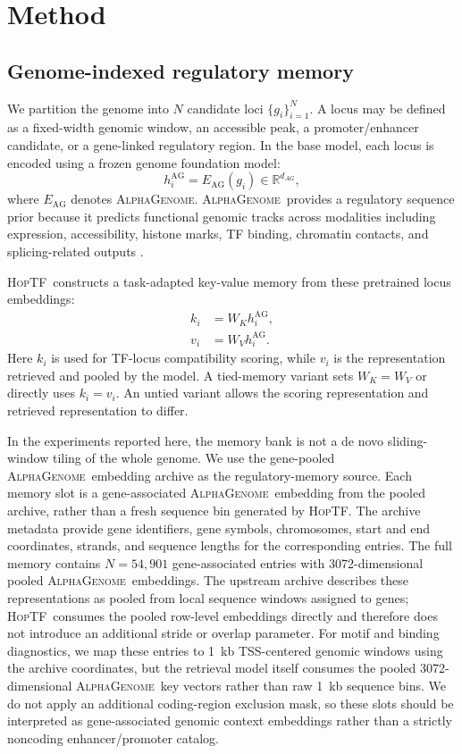 \documentclass[11pt]{article}
\newcommand{\hoptf}{\textsc{HopTF}}
\newcommand{\ag}{\textsc{AlphaGenome}}
\begin{document}
\section{Method}

\subsection{Genome-indexed regulatory memory}

We partition the genome into \(N\) candidate loci \(\{g_i\}_{i=1}^N\). A locus may be defined as a fixed-width genomic window, an accessible peak, a promoter/enhancer candidate, or a gene-linked regulatory region. In the base model, each locus is encoded using a frozen genome foundation model:
\begin{equation}
    h_i^{\mathrm{AG}} = E_{\mathrm{AG}}(g_i) \in \mathbb{R}^{d_{AG}},
\end{equation}
where \(E_{\mathrm{AG}}\) denotes \ag. \ag\ provides a regulatory sequence prior because it predicts functional genomic tracks across modalities including expression, accessibility, histone marks, TF binding, chromatin contacts, and splicing-related outputs \citep{avsec2026}.

\hoptf\ constructs a task-adapted key-value memory from these pretrained locus embeddings:
\begin{align}
    k_i &= W_K h_i^{\mathrm{AG}}, \\
    v_i &= W_V h_i^{\mathrm{AG}}.
\end{align}
Here \(k_i\) is used for TF-locus compatibility scoring, while \(v_i\) is the representation retrieved and pooled by the model. A tied-memory variant sets \(W_K = W_V\) or directly uses \(k_i=v_i\). An untied variant allows the scoring representation and retrieved representation to differ.

In the experiments reported here, the memory bank is not a de novo sliding-window tiling of the whole genome. We use the gene-pooled \ag\ embedding archive as the regulatory-memory source. Each memory slot is a gene-associated \ag\ embedding from the pooled archive, rather than a fresh sequence bin generated by \hoptf. The archive metadata provide gene identifiers, gene symbols, chromosomes, start and end coordinates, strands, and sequence lengths for the corresponding entries. The full memory contains \(N=54{,}901\) gene-associated entries with 3072-dimensional pooled \ag\ embeddings. The upstream archive describes these representations as pooled from local sequence windows assigned to genes; \hoptf\ consumes the pooled row-level embeddings directly and therefore does not introduce an additional stride or overlap parameter. For motif and binding diagnostics, we map these entries to 1~kb TSS-centered genomic windows using the archive coordinates, but the retrieval model itself consumes the pooled 3072-dimensional \ag\ key vectors rather than raw 1~kb sequence bins. We do not apply an additional coding-region exclusion mask, so these slots should be interpreted as gene-associated genomic context embeddings rather than a strictly noncoding enhancer/promoter catalog.
\end{document}
